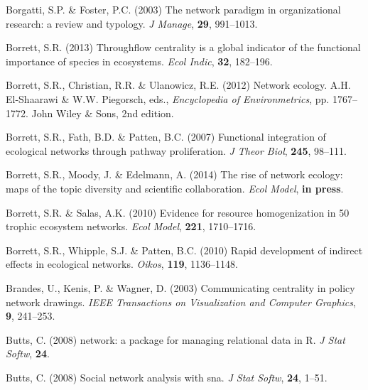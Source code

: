 \documentclass[11pt]{article}
\begin{document}
\begin{thebibliography}{75}
Borgatti, S.P. \& Foster, P.C. (2003) The network paradigm in organizational
  research: a review and typology.
\newblock \emph{J Manage}, \textbf{29}, 991--1013.

Borrett, S.R. (2013) Throughflow centrality is a global indicator of the
  functional importance of species in ecosystems.
\newblock \emph{Ecol Indic}, \textbf{32}, 182--196.

Borrett, S.R., Christian, R.R. \& Ulanowicz, R.E. (2012) Network ecology.
\newblock A.H. El-Shaarawi \& W.W. Piegorsch, eds., \emph{Encyclopedia of
  Environmetrics}, pp. 1767--1772. John Wiley \& Sons, 2nd edition.

Borrett, S.R., Fath, B.D. \& Patten, B.C. (2007) Functional integration of
  ecological networks through pathway proliferation.
\newblock \emph{J Theor Biol}, \textbf{245}, 98--111.

Borrett, S.R., Moody, J. \& Edelmann, A. (2014) The rise of network ecology:
  maps of the topic diversity and scientific collaboration.
\newblock \emph{Ecol Model}, \textbf{in press}.

Borrett, S.R. \& Salas, A.K. (2010) Evidence for resource homogenization in 50
  trophic ecosystem networks.
\newblock \emph{Ecol Model}, \textbf{221}, 1710--1716.

Borrett, S.R., Whipple, S.J. \& Patten, B.C. (2010) Rapid development of
  indirect effects in ecological networks.
\newblock \emph{Oikos}, \textbf{119}, 1136--1148.

Brandes, U., Kenis, P. \& Wagner, D. (2003) Communicating centrality in policy
  network drawings.
\newblock \emph{IEEE Transactions on Visualization and Computer Graphics},
  \textbf{9}, 241--253.

Butts, C. (2008{}) network: a package for managing relational data
  in {R}.
\newblock \emph{J Stat Softw}, \textbf{24}.

Butts, C. (2008{}) Social network analysis with sna.
\newblock \emph{J Stat Softw}, \textbf{24}, 1--51.


\end{thebibliography}
\end{document}
